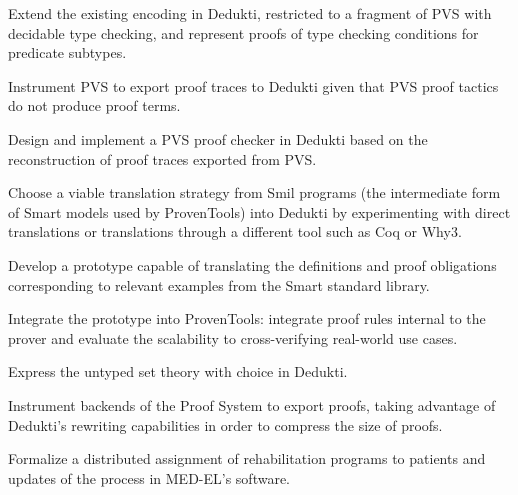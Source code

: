\begin{workpackage}
\begin{tasklist}
\begin{task}[id=pvs,
  title=Express the theory of PVS in Dedukti,
  shorttitle=PVS,
  lead=Inr,   %
  InrRM=20,  %
  wphases=1-48,
  ]
  \vspace{-5mm}
  \begin{compactitem}
  \item Extend the existing encoding in Dedukti,
    restricted to a fragment of PVS with decidable type checking, and represent
    proofs of type checking conditions for predicate subtypes.
  \item Instrument PVS to export proof traces to Dedukti given that PVS proof
    tactics do not produce proof terms.
  \item Design and implement a PVS proof checker in Dedukti based on the
    reconstruction of proof traces exported from PVS.
  \end{compactitem}
\end{task}

\begin{task}[id=smart,
  title=Express Smart models and proofs in Dedukti,
  shorttitle=Smart,
  lead=Pro,   %
  ProRM=11,
  wphases=1-48,
  ]
  \vspace{-5mm}
  \begin{compactitem}
  \item Choose a viable translation strategy from Smil programs (the
    intermediate form of Smart models used by ProvenTools) into Dedukti
    by experimenting with direct translations or translations through a
    different tool such as Coq or Why3.
  \item Develop a prototype capable of translating the definitions and proof
    obligations corresponding to relevant examples from the Smart
    standard library.
  \item Integrate the prototype into ProvenTools: integrate proof rules internal
    to the prover and evaluate the scalability to cross-verifying real-world use
    cases.
  \end{compactitem}
\end{task}

\begin{task}[id=tla,
  title=Express the theory of \tlaplus in Dedukti,
  shorttitle=\tlaplus,
  lead=Inr,   %
  InrRM=21,   %
  MedRM=4,
  wphases=1-48,
  ]
  \vspace{-5mm}
  \begin{compactitem}
  \item Express the untyped \tlaplus set theory with choice in
    Dedukti.
  \item Instrument backends of the \tlaplus Proof System to export proofs,
    taking advantage of Dedukti's rewriting capabilities in order to compress
    the size of proofs.
  \item Formalize a distributed assignment of rehabilitation programs to
    patients and updates of the process in MED-EL's software.
  \end{compactitem}
\end{task}


\end{tasklist}
\end{workpackage}
